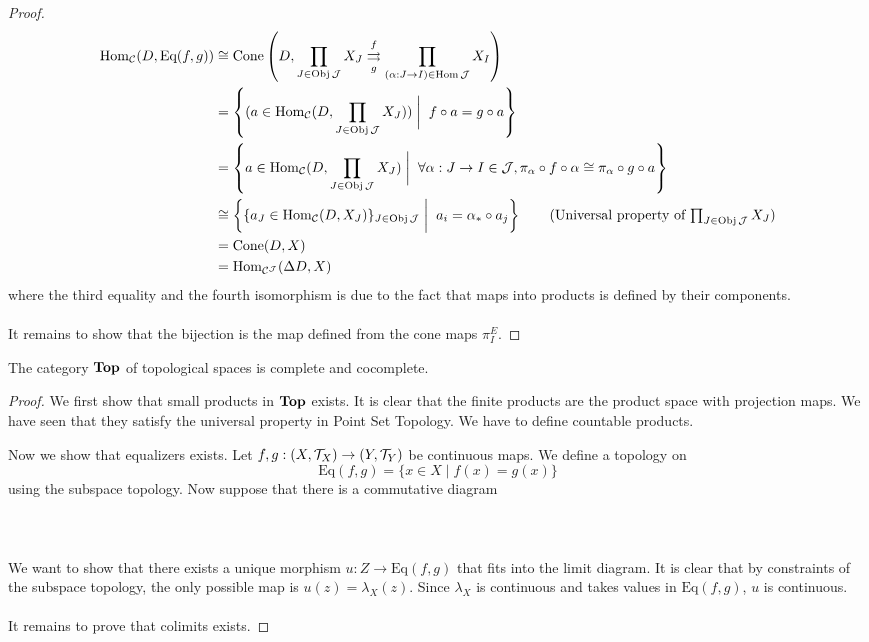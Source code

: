 \documentclass[a4paper]{article}
\begin{document}
\begin{thm}{}{}
\begin{proof}
\begin{align*}
\Hom_\mC(D,\text{Eq}(f,g))&\cong\text{Cone}\left(D,\prod_{J\in\Obj\mJ}X_J\overset{f}{\underset{g}{\rightrightarrows}}\prod_{(\alpha:J\to I)\in\Hom\mJ}X_I\right)\\
&=\left\{(a\in\Hom_\mC(D,\prod_{J\in\Obj\mJ}X_J))\;\bigg{|}\;\; f\circ a=g\circ a\right\}\\
&=\left\{a\in\Hom_\mC(D,\prod_{J\in\Obj\mJ}X_J)\;\bigg{|}\;\;\forall\alpha:J\to I\in\mJ, \pi_\alpha\circ f\circ\alpha\cong\pi_\alpha\circ g\circ a\right\}\\
&\cong\left\{\{a_J\in\Hom_\mC(D,X_J)\}_{J\in\Obj\mJ}\;\bigg{|}\;\; a_i=\alpha_\ast\circ a_j\right\}\tag{Universal property of $\prod_{J\in\Obj\mJ}X_J$}\\
&=\text{Cone}(D,X)\\
&=\Hom_{\mC^\mJ}(\Delta D,X)
\end{align*}
where the third equality and the fourth isomorphism is due to the fact that maps into products is defined by their components. \\~\\

It remains to show that the bijection is the map defined from the cone maps $\pi_I^E$. 
\end{proof}
\end{thm}

\begin{crl}{}{} The category $\bold{Top}$ of topological spaces is complete and cocomplete. \tcbline
\begin{proof}
We first show that small products in $\bold{Top}$ exists. It is clear that the finite products are the product space with projection maps. We have seen that they satisfy the universal property in Point Set Topology. We have to define countable products. 

Now we show that equalizers exists. Let $f,g:(X,\mathcal{T}_X)\to(Y,\mathcal{T}_Y)$ be continuous maps. We define a topology on $$\text{Eq}(f,g)=\{x\in X\;|\;f(x)=g(x)\}$$ using the subspace topology. Now suppose that there is a commutative diagram \\~\\
 \\~\\
We want to show that there exists a unique morphism $u:Z\to\text{Eq}(f,g)$ that fits into the limit diagram. It is clear that by constraints of the subspace topology, the only possible map is $u(z)=\lambda_X(z)$. Since $\lambda_X$ is continuous and takes values in $\text{Eq}(f,g)$, $u$ is continuous. \\~\\

It remains to prove that colimits exists. 
\end{proof}
\end{crl}
\end{document}
